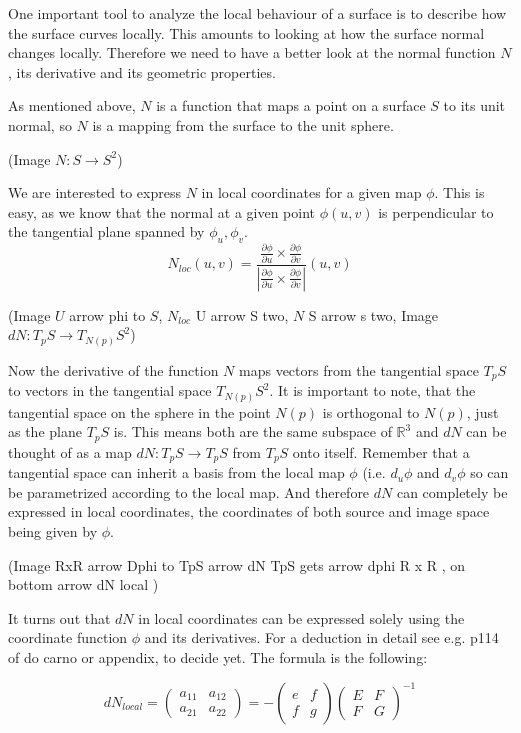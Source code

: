 One important tool to analyze the local behaviour of a surface is to describe how the surface curves locally. This amounts to looking at how the surface normal changes locally. Therefore we need to have a better look at the normal function $N$, its derivative and its geometric properties. 

As mentioned above, $N$ is a function that maps a point on a surface $S$ to its unit normal, so $N$ is a mapping from the surface to the unit sphere.

(Image $N: S \rightarrow S^2$)

We are interested to express $N$ in local coordinates for a given map $\phi$. This is easy, as we know that the normal at a given point $\phi(u,v)$ is perpendicular to the tangential plane spanned by $\phi_u, \phi_v$.
\[N_{loc}(u,v) = \frac{\frac{\partial \phi}{\partial u} \times \frac{\partial \phi}{\partial v}}{|\frac{\partial \phi}{\partial u} \times \frac{\partial \phi}{\partial v}|} (u,v) \]

(Image $U$ arrow phi to $S$, $N_{loc}$ U arrow S two, $N$ S arrow s two, Image $dN: T_pS \rightarrow T_{N(p)}S^2$)

Now the derivative of the function $N$ maps vectors from the tangential space $T_pS$ to vectors in the tangential space $T_{N(p)}S^2$. It is important to note, that the tangential space on the sphere in the point $N(p)$ is orthogonal to $N(p)$, just as the plane $T_pS$ is. This means both are the same subspace of $\mathbb R^3$ and $dN$ can be thought of as a map $dN: T_pS \rightarrow T_pS$ from $T_pS$ onto itself. Remember that a tangential space can inherit a basis from the local map $\phi$ (i.e. $d_u \phi$ and $d_v \phi$ so can be parametrized according to the local map. And therefore $dN$ can completely be expressed in local coordinates, the coordinates of both source and image space being given by $\phi$.

(Image RxR arrow Dphi to TpS arrow dN TpS gets arrow dphi R x R , on bottom arrow dN local )

It turns out that $dN$ in local coordinates can be expressed solely using the coordinate function $\phi$ and its derivatives. For a deduction in detail see e.g. p114 of do carno or appendix, to decide yet. The formula is the following:

\[dN_{local} = \begin{pmatrix} a_{11} & a_{12} \\ a_{21} & a_{22} \end{pmatrix} = - \begin{pmatrix} e & f \\ f & g \end{pmatrix} \begin{pmatrix} E & F \\ F & G \end{pmatrix}^{-1}\]

